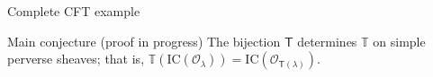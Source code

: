 \documentclass[final]{beamer}
\newlength{\threecolwid}
\newcommand{\TT}{\mathbb{T}}
\newcommand{\cO}{\mathcal{O}}
\newcommand{\sT}{\mathsf{T}}
\newcommand{\IC}{\mathrm{IC}}
\begin{document}
\begin{frame}[t]
\begin{columns}[t]
\begin{column}{\threecolwid}
\begin{block}{Complete CFT example}
\end{block}

\vspace{-7mm}
\begin{alertblock}{Main conjecture (proof in progress)}
The bijection $\sT$ determines $\TT$ on simple perverse sheaves; that is, $\TT(\IC(\cO_{\lambda})) = \IC(\cO_{\sT(\lambda)})$.    


\end{alertblock}
\end{column}
\end{columns}
\end{frame}
\end{document}
